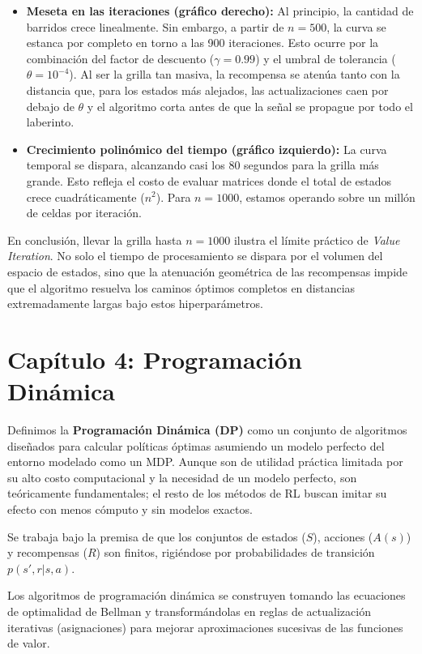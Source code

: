 \documentclass[11pt,a4paper]{article}
\begin{document}
\begin{itemize}
    \item \textbf{Meseta en las iteraciones (gráfico derecho):} Al principio, la cantidad de barridos crece linealmente. Sin embargo, a partir de $n=500$, la curva se estanca por completo en torno a las 900 iteraciones. Esto ocurre por la combinación del factor de descuento ($\gamma = 0.99$) y el umbral de tolerancia ($\theta = 10^{-4}$). Al ser la grilla tan masiva, la recompensa se atenúa tanto con la distancia que, para los estados más alejados, las actualizaciones caen por debajo de $\theta$ y el algoritmo corta antes de que la señal se propague por todo el laberinto.
    
    \item \textbf{Crecimiento polinómico del tiempo (gráfico izquierdo):} La curva temporal se dispara, alcanzando casi los 80 segundos para la grilla más grande. Esto refleja el costo de evaluar matrices donde el total de estados crece cuadráticamente ($n^2$). Para $n=1000$, estamos operando sobre un millón de celdas por iteración.
\end{itemize}

En conclusión, llevar la grilla hasta $n=1000$ ilustra el límite práctico de \textit{Value Iteration}. No solo el tiempo de procesamiento se dispara por el volumen del espacio de estados, sino que la atenuación geométrica de las recompensas impide que el algoritmo resuelva los caminos óptimos completos en distancias extremadamente largas bajo estos hiperparámetros.

\section{Capítulo 4: Programación Dinámica}

Definimos la \textbf{Programación Dinámica (DP)} como un conjunto de algoritmos diseñados para calcular políticas óptimas asumiendo un modelo perfecto del entorno modelado como un MDP. Aunque son de utilidad práctica limitada por su alto costo computacional y la necesidad de un modelo perfecto, son teóricamente fundamentales; el resto de los métodos de RL buscan imitar su efecto con menos cómputo y sin modelos exactos.

Se trabaja bajo la premisa de que los conjuntos de estados ($S$), acciones ($A(s)$) y recompensas ($R$) son finitos, rigiéndose por probabilidades de transición $p(s', r \vert s, a)$.

Los algoritmos de programación dinámica se construyen tomando las ecuaciones de optimalidad de Bellman y transformándolas en reglas de actualización iterativas (asignaciones) para mejorar aproximaciones sucesivas de las funciones de valor.
\end{document}
